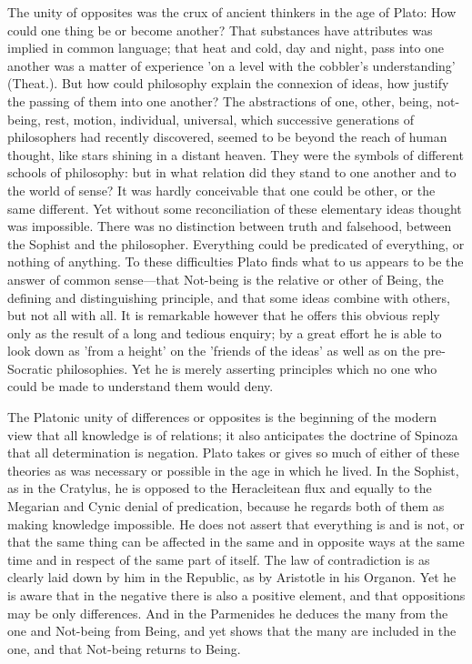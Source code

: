 \documentclass[11pt,letter]{article}
\begin{document}
\par  The unity of opposites was the crux of ancient thinkers in the age of Plato: How could one thing be or become another? That substances have attributes was implied in common language; that heat and cold, day and night, pass into one another was a matter of experience 'on a level with the cobbler's understanding' (Theat.). But how could philosophy explain the connexion of ideas, how justify the passing of them into one another? The abstractions of one, other, being, not-being, rest, motion, individual, universal, which successive generations of philosophers had recently discovered, seemed to be beyond the reach of human thought, like stars shining in a distant heaven. They were the symbols of different schools of philosophy: but in what relation did they stand to one another and to the world of sense? It was hardly conceivable that one could be other, or the same different. Yet without some reconciliation of these elementary ideas thought was impossible. There was no distinction between truth and falsehood, between the Sophist and the philosopher. Everything could be predicated of everything, or nothing of anything. To these difficulties Plato finds what to us appears to be the answer of common sense—that Not-being is the relative or other of Being, the defining and distinguishing principle, and that some ideas combine with others, but not all with all. It is remarkable however that he offers this obvious reply only as the result of a long and tedious enquiry; by a great effort he is able to look down as 'from a height' on the 'friends of the ideas' as well as on the pre-Socratic philosophies. Yet he is merely asserting principles which no one who could be made to understand them would deny.

\par  The Platonic unity of differences or opposites is the beginning of the modern view that all knowledge is of relations; it also anticipates the doctrine of Spinoza that all determination is negation. Plato takes or gives so much of either of these theories as was necessary or possible in the age in which he lived. In the Sophist, as in the Cratylus, he is opposed to the Heracleitean flux and equally to the Megarian and Cynic denial of predication, because he regards both of them as making knowledge impossible. He does not assert that everything is and is not, or that the same thing can be affected in the same and in opposite ways at the same time and in respect of the same part of itself. The law of contradiction is as clearly laid down by him in the Republic, as by Aristotle in his Organon. Yet he is aware that in the negative there is also a positive element, and that oppositions may be only differences. And in the Parmenides he deduces the many from the one and Not-being from Being, and yet shows that the many are included in the one, and that Not-being returns to Being.
\end{document}
